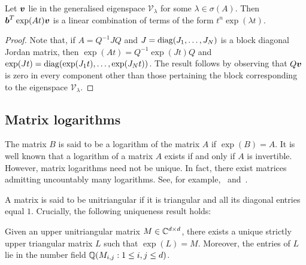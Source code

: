 \begin{proposition}
  Let $\boldsymbol{v}$ lie in the generalised eigenspace
  $\mathcal{V}_{\lambda}$ for some $\lambda \in \sigma(A)$.  Then
  $\boldsymbol{b}^{T}\exp(At)\boldsymbol{v}$ is a linear combination
  of terms of the form $t^{n}\exp(\lambda t)$.
\label{prop:linear}
\end{proposition}

\begin{proof}
  Note that, if $A=Q^{-1}JQ$ and $J=\operatorname{diag}(J_{1},\ldots,J_{N})$ is a block diagonal Jordan matrix, then $\exp(At)=Q^{-1}\exp(Jt)Q$ and $\exp(Jt)=\operatorname{diag}(\exp(J_{1}t),\ldots,\exp(J_{N}t))$.
The result follows by observing that $Q\boldsymbol{v}$ is zero in every component other than those pertaining the block corresponding to the eigenspace $\mathcal{V}_{\lambda}$.
\end{proof}

\subsection{Matrix logarithms}

The matrix $B$ is said to be a logarithm of the matrix $A$ if $\exp(B) = A$. It is well known that a logarithm of a matrix $A$ exists if and only if $A$ is invertible. However, matrix logarithms need not be unique. In fact, there exist matrices admitting uncountably many logarithms. See, for example,~\cite{MatrixLogs1} and~\cite{MatrixLogs2}.

A matrix is said to be unitriangular if it is triangular and all its diagonal entries equal $1$. Crucially, the following uniqueness result holds:

\begin{theorem}
\label{thm:log_uniqueness}
Given an upper unitriangular matrix $M \in \mathbb{C}^{d \times d}$, there exists a unique strictly upper triangular matrix $L$ such that $\exp(L)=M$. Moreover, the entries of $L$ lie in the number field $\mathbb{Q}(M_{i,j}: 1 \leq i,j \leq d)$.
\end{theorem}


